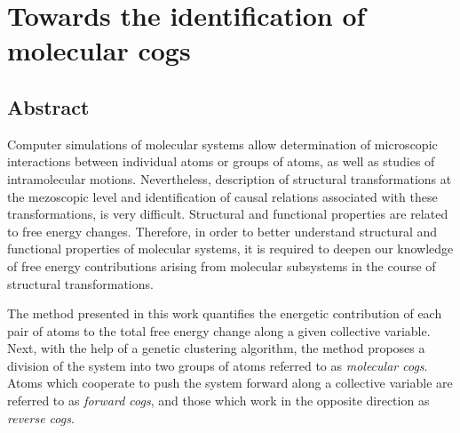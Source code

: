 \documentclass[a4paper,11pt,twoside]{book}%
\begin{document}



\newenvironment{packeditemize}
{ \begin{itemize}
    \setlength{\itemsep}{1.5pt}
    \setlength{\parskip}{1.5pt}
    \setlength{\parsep}{1.5pt}     }
{ \end{itemize}                  } 

\newenvironment{packedenum}
{ \begin{enumerate}
    \setlength{\itemsep}{1.5pt}
    \setlength{\parskip}{1.5pt}
    \setlength{\parsep}{1.5pt}     }
{ \end{enumerate}                  } 


\newcommand{\specialcell}[2][c]{%
  \begin{tabular}[#1]{@{}c@{}}#2\end{tabular}}


  
\chapter{Towards the identification of molecular cogs}

\section{Abstract}
Computer simulations of molecular systems allow determination of microscopic interactions between individual atoms or groups of atoms, as well as studies of intramolecular motions. 
Nevertheless, description of structural transformations at the mezoscopic level and identification of causal relations associated with these transformations, is very difficult.
Structural and functional properties are related to free energy changes.
Therefore, in order to better understand structural and functional properties of molecular systems, it is required to deepen our knowledge of free energy contributions arising from molecular subsystems in the course of structural transformations.

The method presented in this work quantifies the energetic contribution of each pair of atoms to the total free energy change along a given collective variable.
Next, with the help of a genetic clustering algorithm, the method proposes a division of the system into two groups of atoms referred to as \emph{molecular cogs}.
Atoms which cooperate to push the system forward along a collective variable are referred to as \emph{forward cogs}, and those which work in the opposite direction as \emph{reverse cogs}.
\end{document}
